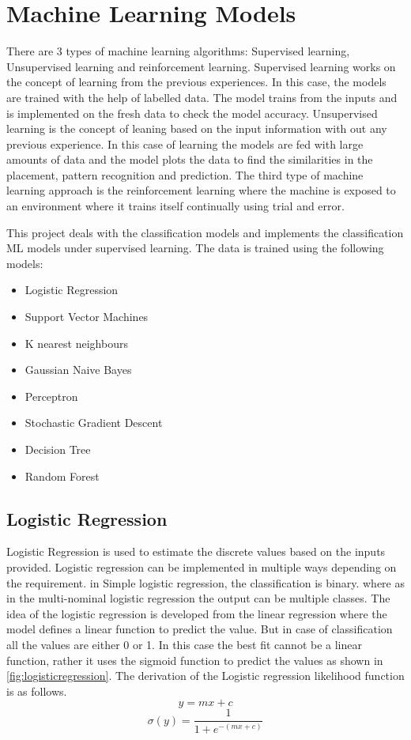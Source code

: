 \section{Machine Learning Models}
There are 3 types of machine learning algorithms: Supervised learning, Unsupervised learning and reinforcement learning. Supervised learning works on the concept of learning from the previous experiences. In this case, the models are trained with the help of labelled data. The model trains from the inputs and is implemented on the fresh data to check the model accuracy. Unsupervised learning is the concept of leaning based on the input information with out any previous experience. In this case of learning the models are fed with large amounts of data and the model plots the data to find the similarities in the placement, pattern recognition and prediction. The third type of machine learning approach is the reinforcement learning where the machine is exposed to an environment where it trains itself continually using trial and error.

This project deals with the classification models and implements the classification ML models under supervised learning. The data is trained using the following models:
\begin{itemize}
	\item Logistic Regression
	\item Support Vector Machines
	\item K nearest neighbours
	\item Gaussian Naive Bayes
	\item Perceptron
	\item Stochastic Gradient Descent
	\item Decision Tree
	\item Random Forest
\end{itemize}

\subsection{Logistic Regression}
Logistic Regression is used to estimate the discrete values based on the inputs provided. Logistic regression can be implemented in multiple ways depending on the requirement. in Simple logistic regression, the classification is binary. where as in the multi-nominal logistic regression the output can be multiple classes. The idea of the logistic regression is developed from the linear regression where the model defines a linear function to predict the value. But in case of classification all the values are either 0 or 1. In this case the best fit cannot be a linear function, rather it uses the sigmoid function to predict the values as shown in \ref{fig:logisticregression}. The derivation of the Logistic regression likelihood function is as follows.
 \begin{equation}\label{eqn:linear}
    y = mx + c
 \end{equation}
 \begin{equation}\label{eqn:sigmoid}
    \sigma(y) = \frac {1}{1+ e^{-(mx + c)}}
 \end{equation}


